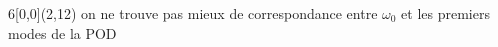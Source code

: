 \documentclass[12pt]{beamer}
\newcommand\encircleR[1]{%
  \tikz[baseline=(X.base)] 
    \node (X) [draw, shape=circle, inner sep=0,minimum size=1cm, color=red, line width=1.5] {\strut #1};}
\newcommand\encircleB[1]{%
  \tikz[baseline=(X.base)] 
    \node (X) [draw, shape=circle, inner sep=0,minimum size=1cm, color=blue, line width=1.5] {\strut #1};}
\newcommand\encircleK[1]{%
  \tikz[baseline=(X.base)] 
    \node (X) [draw, shape=circle, inner sep=0,minimum size=1cm, color=black, line width=1.5] {\strut #1};}
\newcommand\encircledR[1]{%
  \tikz[baseline=(X.base)] 
    \node (X) [draw, shape=circle, inner sep=0,minimum size=1cm, color=red, dashed, line width=1.5] {\strut #1};}
\newcommand\encircledB[1]{%
  \tikz[baseline=(X.base)] 
    \node (X) [draw, shape=circle, inner sep=0,minimum size=1cm, color=blue, dashed, line width=1.5] {\strut #1};}
\newcommand\encircledK[1]{%
  \tikz[baseline=(X.base)] 
    \node (X) [draw, shape=circle, inner sep=0,minimum size=1cm, color=black, dashed, line width=1.5] {\strut #1};}
\begin{document}
\begin{frame}
\begin{itemize}
\begin{itemize}
{\begin{figure}
\begin{minipage}{0.3\linewidth}
							\end{minipage}
						\end{figure}
						\begin{textblock}{6}[0,0](2,12)
							on ne trouve pas mieux de correspondance entre $\omega_0$ et les premiers modes de la POD
						\end{textblock}
						}
				\end{itemize}  %
		\end{itemize}

	\end{frame}


\end{document}

